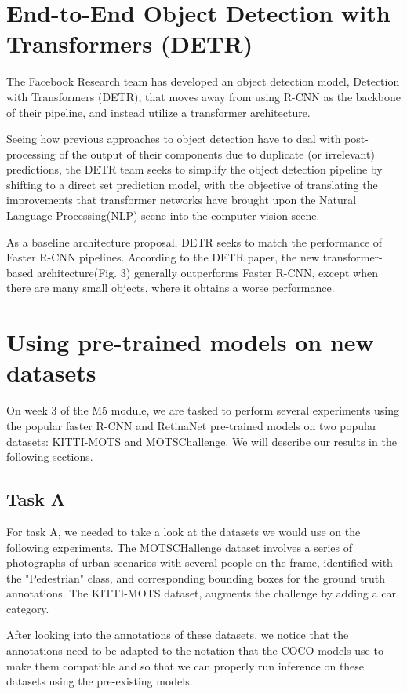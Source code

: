 \documentclass[12pt,a4paper,twocolumn,twoside]{article}
\begin{document}
\section{End-to-End Object Detection with Transformers (DETR)}
The Facebook Research team has developed an object detection model, Detection with Transformers (DETR)\cite{carion_massa_synnaeve_usunier_kirillov_zagoruyko_2020}, that moves away from using R-CNN as the backbone of their pipeline, and instead utilize a transformer architecture. 

Seeing how previous approaches to object detection have to deal with post-processing of the output of their components due to duplicate (or irrelevant) predictions, the DETR team seeks to simplify the object detection pipeline by shifting to a direct set prediction model, with the objective of translating the improvements that transformer networks have brought upon the Natural Language Processing(NLP) scene into the computer vision scene.

As a baseline architecture proposal, DETR seeks to match the performance of Faster R-CNN pipelines. According to the DETR paper, the new transformer-based architecture(Fig. 3) generally outperforms Faster R-CNN, except when there are many small objects, where it obtains a worse performance.

\section{Using pre-trained models on new datasets}

On week 3 of the M5 module, we are tasked to perform several experiments using 
the popular faster R-CNN and RetinaNet pre-trained models on two popular
datasets: KITTI-MOTS and MOTSChallenge. We will describe our results in the 
following sections.

\subsection{Task A}

For task A, we needed to take a look at the datasets we would use on the 
following experiments. The MOTSCHallenge dataset involves a series of 
photographs of urban scenarios with several people on the frame,
identified with the "Pedestrian" class, and corresponding bounding boxes
for the ground truth annotations. The KITTI-MOTS dataset, augments the
challenge by adding a car category.

After looking into the annotations of these datasets, we notice that
the annotations need to be adapted to the notation that the COCO models
use to make them compatible and so that we can properly run inference on
these datasets using the pre-existing models.
\end{document}
